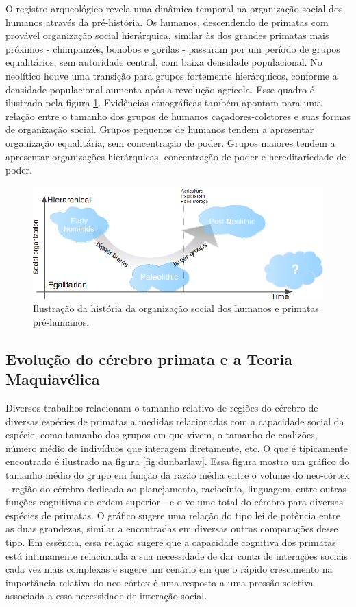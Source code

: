 O registro arqueológico revela uma dinâmica temporal na organização social dos humanos através da pré-história. Os humanos, descendendo de primatas com provável organização social hierárquica, similar às dos grandes primatas mais próximos - chimpanzés, bonobos e gorilas - passaram por um período de grupos equalitários, sem autoridade central, com baixa densidade populacional. No neolítico houve uma transição para grupos fortemente hierárquicos, conforme a densidade populacional aumenta após a revolução agrícola. Esse quadro é ilustrado pela figura \ref{fig:ushaped}. Evidências etnográficas também apontam para uma relação entre o tamanho dos grupos de humanos caçadores-coletores e suas formas de organização social\cite{Currie2010}. Grupos pequenos de humanos tendem a apresentar organização equalitária, sem concentração de poder. Grupos maiores tendem a apresentar organizações hierárquicas, concentração de poder e hereditariedade de poder. 
\begin{figure}
	\centering
	\includegraphics[width = 1.1\textwidth]{figuras/ushaped.png}
	\caption{\label{fig:ushaped} Ilustração da história da organização social dos humanos e primatas pré-humanos.}
\end{figure}


\subsection{Evolução do cérebro primata e a Teoria Maquiavélica}

Diversos trabalhos\cite[-1cm]{Dunbar2008,Dunbar2009, Dunbar2010,Aiello1993,Joffe1997} relacionam o tamanho relativo de regiões do cérebro de diversas espécies de primatas a medidas relacionadas com a capacidade social da espécie, como tamanho dos grupos em que vivem, o tamanho de coalizões, número médio de indivíduos que interagem diretamente, etc. O que é típicamente encontrado é ilustrado na figura \ref{fig:dunbarlaw}. Essa figura mostra um gráfico do tamanho médio do grupo em função da razão média entre o volume do neo-córtex - região do cérebro dedicada ao planejamento, raciocínio, linguagem, entre outras funções cognitivas de ordem superior - e o volume total do cérebro para diversas espécies de primatas. O gráfico sugere uma relação do tipo lei de potência entre as duas grandezas, similar a encontradas em diversas outras comparações desse tipo. Em essência, essa relação sugere que a capacidade cognitiva dos primatas está intimamente relacionada a sua necessidade de dar conta de interações sociais cada 
vez mais complexas e sugere um cenário em que o rápido crescimento na importância relativa do neo-córtex é uma resposta a uma pressão seletiva associada a essa necessidade de interação social.  

